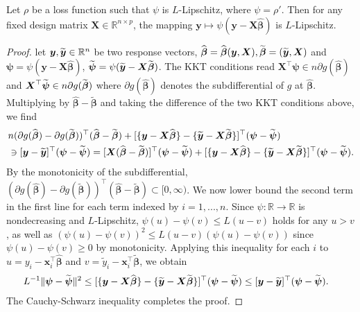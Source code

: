 \documentclass[11pt]{amsart}
\numberwithin{equation}{section}
\numberwithin{equation}{section}
\def\real{{\mathbb{R}}}
\def\R{{\real}}
\def\mathbold{\boldsymbol} %
\def\bx{\mathbold{x}}\def\xhat{\widehat{x}}\def\xtil{\widetilde{x}}\def\xbar{{\overline x}}\def\vbx{{\bf x}}
\def\bX{\mathbold{X}}\def\hbX{{\widehat{\bX}}}\def\tbX{{\widetilde{\bX}}}\def\bXbar{{\overline \bX}}
\def\by{\mathbold{y}}\def\yhat{\widehat{y}}\def\ytil{\widetilde{y}}\def\ybar{{\overline y}}\def\vby{{\bf y}}
\def\bbeta{\mathbold{\beta}}\def\betahat{\widehat{\beta}}\def\hbeta{\widehat{\beta}}
\def\hbbeta{{{\widehat{\bbeta}}}}
\def\tbbeta{\widetilde{\bbeta}}
\def\bpsi{\mathbold{\psi}}\def\psihat{\widehat{\psi}}\def\hpsi{\widehat{\psi}}
\begin{document}
\begin{proposition}
    \label{prop:hbG-Lipschitz}
    Let $\rho$ be a loss function such that $\psi$ is $L$-Lipschitz,
    where $\psi=\rho'$. Then for any fixed design matrix $\bX\in\R^{n\times p}$,
    the mapping
    $\by\mapsto  \psi(\by-\bX\hbbeta)$
    is $L$-Lipschitz.
\end{proposition}
\begin{proof}
    let $\by,\tby\in\R^n$
    be two response vectors, $\hbbeta=\hbbeta(\by,\bX),\tbbeta=(\tby,\bX)$
    and $\bpsi=\psi(\by-\bX\hbbeta)$, $\tbpsi = \psi(\tby-\bX\tbbeta)$.
    The KKT conditions read
    $\bX^\top\bpsi \in n \partial g(\hbbeta)$ and
    $\bX^\top\tbpsi \in n\partial g(\tbbeta)$
    where $\partial g(\hbbeta)$ denotes the subdifferential
    of $g$ at $\hbbeta$.
    Multiplying by $\hbbeta-\tbbeta$ and taking the difference
    of the two KKT conditions above,
    we find
    \begin{align}
        \nonumber
       &n(\partial g(\hbbeta)- \partial g(\tbbeta))^\top(\hbbeta-\tbbeta) 
       +
       [\{\by - \bX\hbbeta\} -\{\tby - \bX\tbbeta\} ]^\top(\bpsi - \tbpsi)
       \\& \ni
       [\by - \tby]^\top(\bpsi -\tbpsi)
       =
       [\bX(\hbbeta-\tbbeta)]^\top(\bpsi-\tbpsi)
       + 
       [\{\by - \bX\hbbeta\} -\{\tby - \bX\tbbeta\} ]^\top(\bpsi - \tbpsi)
       .
       \label{eq:intermediate-KKT-prop5.1}
    \end{align}
    By the monotonicity of the subdifferential,
    $(\partial g(\hbbeta)- \partial g(\tbbeta))^\top(\hbbeta-\tbbeta)
    \subset [0,\infty)$.
    We now lower bound the second term in the first line for each term
    indexed by $i=1,...,n$.
    Since
    $\psi:\R\to\R$ is nondecreasing and $L$-Lipschitz,
    $\psi(u) - \psi(v) \le L (u-v)$ holds for any $u>v$,
    as well as 
    $(\psi(u) - \psi(v))^2 \le L (u-v) (\psi(u) - \psi(v))$
    since $\psi(u) - \psi(v) \ge 0$ by monotonicity.
    Applying this inequality for each $i$ to
    $u=y_i-\bx_i^\top\hbbeta$ and $v=\tilde y_i - \bx_i^\top\tbbeta$, we 
    obtain
    \begin{align*}
        L^{-1} \|\bpsi - \tbpsi\|^2
    &\le[\{\by - \bX\hbbeta\} -\{\tby - \bX\tbbeta\} ]^\top(\bpsi - \tbpsi)
       \le [\by - \tby]^\top(\bpsi -\tbpsi).
    \end{align*}
    The Cauchy-Schwarz inequality completes the proof.
\end{proof}
\end{document}
